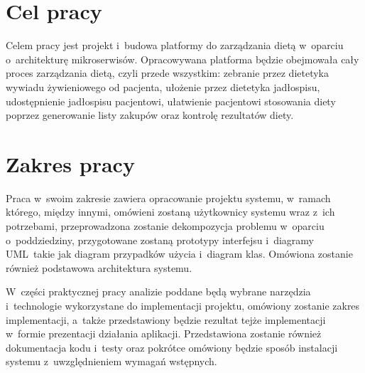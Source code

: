\section*{Cel pracy}\label{sec:thesis-goal}

Celem pracy jest projekt i~budowa platformy do zarządzania dietą w~oparciu o~architekturę mikroserwisów.
Opracowywana platforma będzie obejmowała cały proces zarządzania dietą, czyli przede wszystkim:
zebranie przez dietetyka wywiadu żywieniowego od pacjenta,
ułożenie przez dietetyka jadłospisu,
udostępnienie jadłospisu pacjentowi,
ułatwienie pacjentowi stosowania diety poprzez generowanie listy zakupów
oraz kontrolę rezultatów diety.

\section*{Zakres pracy}\label{sec:scope-of-work}

Praca w~swoim zakresie zawiera opracowanie projektu systemu, w~ramach którego, między innymi,
omówieni zostaną użytkownicy systemu wraz z~ich potrzebami,
przeprowadzona zostanie dekompozycja problemu w~oparciu o~poddziedziny,
przygotowane zostaną prototypy interfejsu i~diagramy UML~takie jak diagram przypadków użycia i~diagram klas.
Omówiona zostanie również podstawowa architektura systemu.
\par
W~części praktycznej pracy analizie poddane będą wybrane narzędzia i~technologie wykorzystane do implementacji projektu,
omówiony zostanie zakres implementacji, a~także przedstawiony będzie rezultat tejże implementacji w~formie prezentacji działania aplikacji.
Przedstawiona zostanie również dokumentacja kodu i~testy oraz pokrótce omówiony będzie sposób instalacji systemu z~uwzględnieniem wymagań wstępnych.

\thispagestyle{normal}
